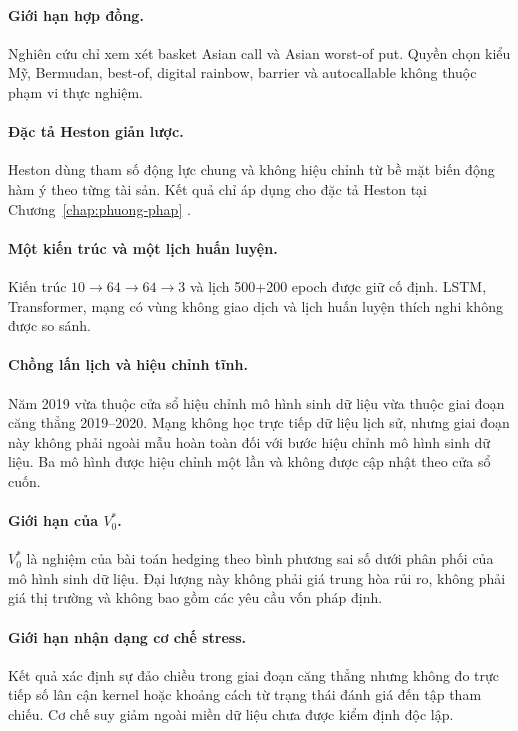 \paragraph{Giới hạn hợp đồng.}
Nghiên cứu chỉ xem xét basket Asian call và Asian worst-of put. Quyền chọn kiểu
Mỹ, Bermudan, best-of, digital rainbow, barrier và autocallable không thuộc
phạm vi thực nghiệm.

\paragraph{Đặc tả Heston giản lược.}
Heston dùng tham số động lực chung và không hiệu chỉnh từ bề mặt biến động hàm
ý theo từng tài sản. Kết quả chỉ áp dụng cho đặc tả Heston tại
Chương~\ref{chap:phuong-phap} \parencite{Dimitroff2011}.

\paragraph{Một kiến trúc và một lịch huấn luyện.}
Kiến trúc $10\to64\to64\to3$ và lịch 500+200 epoch được giữ cố định. LSTM,
Transformer, mạng có vùng không giao dịch và lịch huấn luyện thích nghi không
được so sánh.

\paragraph{Chồng lấn lịch và hiệu chỉnh tĩnh.}
Năm 2019 vừa thuộc cửa sổ hiệu chỉnh mô hình sinh dữ liệu vừa thuộc giai đoạn căng thẳng
2019--2020. Mạng không học trực tiếp dữ liệu lịch sử, nhưng giai đoạn này không
phải ngoài mẫu hoàn toàn đối với bước hiệu chỉnh mô hình sinh dữ liệu. Ba mô
hình được hiệu chỉnh một lần và không được cập nhật theo cửa sổ cuốn.

\paragraph{Giới hạn của $V_0^{*}$.}
$V_0^{*}$ là nghiệm của bài toán hedging theo bình phương sai số dưới phân
phối của mô hình sinh dữ liệu. Đại lượng này không phải giá trung hòa rủi ro,
không phải giá thị trường và không bao gồm các yêu cầu vốn pháp định.

\paragraph{Giới hạn nhận dạng cơ chế stress.}
Kết quả xác định sự đảo chiều trong giai đoạn căng thẳng nhưng không đo trực tiếp số lân cận
kernel hoặc khoảng cách từ trạng thái đánh giá đến tập tham chiếu. Cơ chế suy
giảm ngoài miền dữ liệu chưa được kiểm định độc lập.


